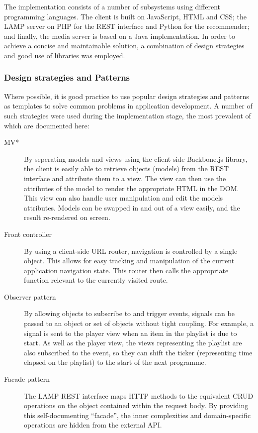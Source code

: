 The implementation consists of a number of subsystems using different programming languages. The client is built on JavaScript, HTML and CSS; the LAMP server on PHP for the REST interface and Python for the recommender; and finally, the media server is based on a Java implementation. In order to achieve a concise and maintainable solution, a combination of design strategies and good use of libraries was employed.

\subsubsection{Design strategies and Patterns}

Where possible, it is good practice to use popular design strategies and patterns as templates to solve common problems in application development. A number of such strategies were used during the implementation stage, the most prevalent of which are documented here:

\begin{description}
	\item[MV*] By seperating models and views using the client-side Backbone.js library, the client is easily able to retrieve objects (models) from the REST interface and attribute them to a view. The view can then use the attributes of the model to render the appropriate HTML in the DOM. This view can also handle user manipulation and edit the models attributes. Models can be swapped in and out of a view easily, and the result re-rendered on screen.
	\item[Front controller] By using a client-side URL router, navigation is controlled by a single object. This allows for easy tracking and manipulation of the current application navigation state. This router then calls the appropriate function relevant to the currently visited route.
	\item[Observer pattern] By allowing objects to subscribe to and trigger events, signals can be passed to an object or set of objects without tight coupling. For example, a signal is sent to the player view when an item in the playlist is due to start. As well as the player view, the views representing the playlist are also subscribed to the event, so they can shift the ticker (representing time elapsed on the playlist) to the start of the next programme.
	\item[Facade pattern] The LAMP REST interface maps HTTP methods to the equivalent CRUD operations on the object contained within the request body. By providing this self-documenting ``facade'', the inner complexities and domain-specific operations are hidden from the external API.
\end{description}

